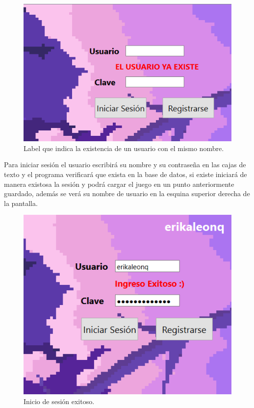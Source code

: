 \documentclass{article}
\begin{document}
\newpage
\begin{figure}[h]
\includegraphics[scale=0.9]{Images/usuarioyaexis.png}
\centering
\caption{Label que indica la existencia de un usuario con el mismo nombre.}
\label{fig:label1}
\end{figure}

Para iniciar sesión el usuario escribirá su nombre y su contraseña en las cajas de texto y el programa verificará que exista en la base de datos, si existe iniciará de manera existosa la sesión y podrá cargar el juego en un punto anteriormente guardado, además se verá su nombre de usuario en la esquina superior derecha de la pantalla.

\begin{figure}[h]
\includegraphics[scale=0.9]{Images/iniciosesion.png}
\centering
\caption{Inicio de sesión exitoso.}
\label{fig:iniciosesion}
\end{figure}
\end{document}
